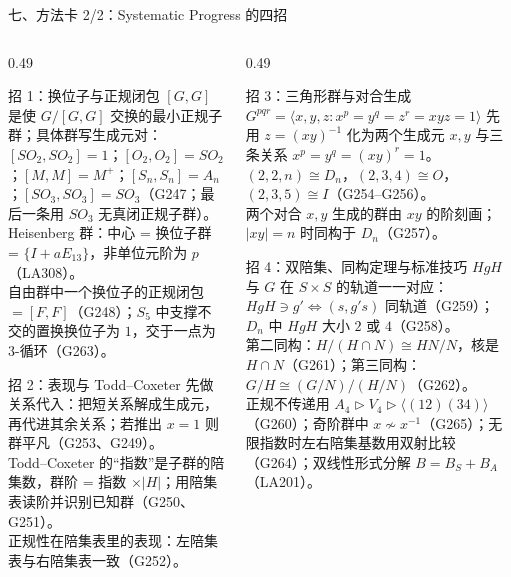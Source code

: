 \documentclass[aspectratio=169,10pt,fontset=none]{ctexbeamer}
\begin{document}
\begin{frame}[t]{七、方法卡 2/2：Systematic Progress 的四招}
  \label{sec:method2}
  \begin{columns}[T,onlytextwidth]
    \begin{column}{0.49\textwidth}
      \begin{block}{\footnotesize 招 1：换位子与正规闭包}
        \scriptsize
        $[G,G]$ 是使 $G/[G,G]$ 交换的最小正规子群；具体群写生成元对：\\
        $[SO_2,SO_2]=1$；$[O_2,O_2]=SO_2$；$[M,M]=M^+$；$[S_n,S_n]=A_n$；$[SO_3,SO_3]=SO_3$（G247；最后一条用 $SO_3$ 无真闭正规子群）。\\
        Heisenberg 群：中心 = 换位子群 = $\{I+aE_{13}\}$，非单位元阶为 $p$（LA308）。\\
        自由群中一个换位子的正规闭包 $=[F,F]$（G248）；$S_5$ 中支撑不交的置换换位子为 $1$，交于一点为 $3$-循环（G263）。
      \end{block}
      \begin{block}{\footnotesize 招 2：表现与 Todd--Coxeter}
        \scriptsize
        先做关系代入：把短关系解成生成元，再代进其余关系；若推出 $x=1$ 则群平凡（G253、G249）。\\
        Todd--Coxeter 的“指数”是子群的陪集数，群阶 = 指数 $\times|H|$；用陪集表读阶并识别已知群（G250、G251）。\\
        正规性在陪集表里的表现：左陪集表与右陪集表一致（G252）。
      \end{block}
    \end{column}
    \begin{column}{0.49\textwidth}
      \begin{block}{\footnotesize 招 3：三角形群与对合生成}
        \scriptsize
        $G^{pqr}=\langle x,y,z:x^p=y^q=z^r=xyz=1\rangle$ 先用 $z=(xy)^{-1}$ 化为两个生成元 $x,y$ 与三条关系 $x^p=y^q=(xy)^r=1$。\\
        $(2,2,n)\cong D_n$，$(2,3,4)\cong O$，$(2,3,5)\cong I$（G254--G256）。\\
        两个对合 $x,y$ 生成的群由 $xy$ 的阶刻画；$|xy|=n$ 时同构于 $D_n$（G257）。
      \end{block}
      \begin{block}{\footnotesize 招 4：双陪集、同构定理与标准技巧}
        \scriptsize
        $HgH$ 与 $G$ 在 $S\times S$ 的轨道一一对应：$HgH\ni g'\iff (s,g's)$ 同轨道（G259）；$D_n$ 中 $HgH$ 大小 $2$ 或 $4$（G258）。\\
        第二同构：$H/(H\cap N)\cong HN/N$，核是 $H\cap N$（G261）；第三同构：$G/H\cong(G/N)/(H/N)$（G262）。\\
        正规不传递用 $A_4\triangleright V_4\triangleright\langle(12)(34)\rangle$（G260）；奇阶群中 $x\not\sim x^{-1}$（G265）；无限指数时左右陪集基数用双射比较（G264）；双线性形式分解 $B=B_S+B_A$（LA201）。
      \end{block}
    \end{column}
  \end{columns}
\end{frame}
\end{document}
